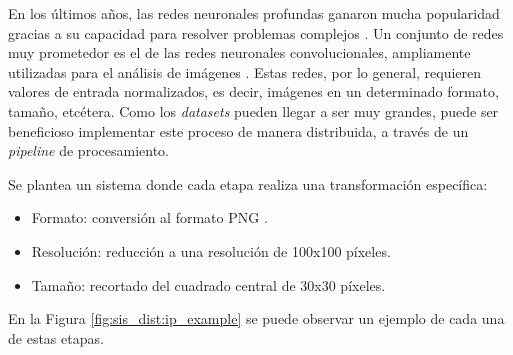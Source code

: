 \documentclass[11pt]{article}
\newcommand{\english}[1]{\textit{#1}}
\begin{document}
En los últimos años, las redes neuronales profundas ganaron mucha popularidad gracias a su capacidad para resolver problemas complejos \cite{sis_dist:dnn}. Un conjunto de redes muy prometedor es el de las redes neuronales convolucionales, ampliamente utilizadas para el análisis de imágenes \cite{sis_dist:cnn}. Estas redes, por lo general, requieren valores de entrada normalizados, es decir, imágenes en un determinado formato, tamaño, etcétera. Como los \english{datasets} pueden llegar a ser muy grandes, puede ser beneficioso implementar este proceso de manera distribuida, a través de un \english{pipeline} de procesamiento.

Se plantea un sistema donde cada etapa realiza una transformación específica:
\begin{itemize}
    \item Formato: conversión al formato PNG \cite{sis_dist:png}.
    \item Resolución: reducción a una resolución de 100x100 píxeles.
    \item Tamaño: recortado del cuadrado central de 30x30 píxeles.
\end{itemize}

En la Figura \ref{fig:sis_dist:ip_example} se puede observar un ejemplo de cada una de estas etapas.
\end{document}
